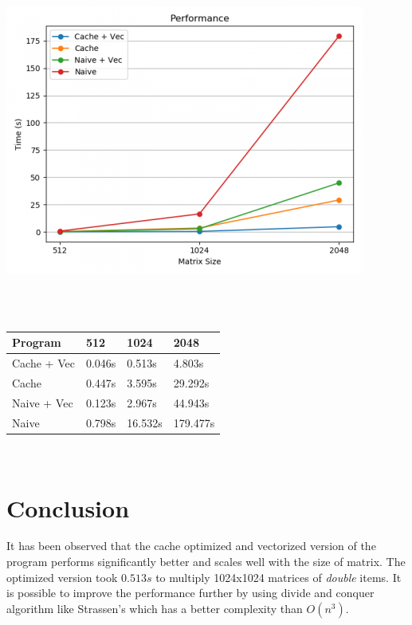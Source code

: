 \documentclass[11pt,a4paper,oneside]{article}
\begin{document}
    \begin{center}
	\includegraphics[scale=0.7]{mm_plot.png}
	\end{center}

    \begin{verbatim}
    
    
    \end{verbatim}

	\begin{center}
	\begin{tabular}{|l|l|l|l|}
		\hline
		Program & 512 & 1024 &  2048\\
		\hline
		Cache + Vec & 0.046s & 0.513s & 4.803s \\
		Cache & 0.447s & 3.595s & 29.292s \\
		Naive + Vec & 0.123s & 2.967s & 44.943s \\
		Naive & 0.798s & 16.532s & 179.477s \\				
		\hline
	\end{tabular}
	\end{center}

     \begin{verbatim}
    
    \end{verbatim}

    \section{Conclusion}
    It has been observed that the cache optimized and vectorized version of the program performs significantly better and scales well with the size of matrix. The optimized version took $0.513s$ to multiply 1024x1024 matrices of \emph{double} items. It is possible to improve the performance further by using divide and conquer algorithm like Strassen's which has a better complexity than $O(n^3)$. 
    
\end{document}
